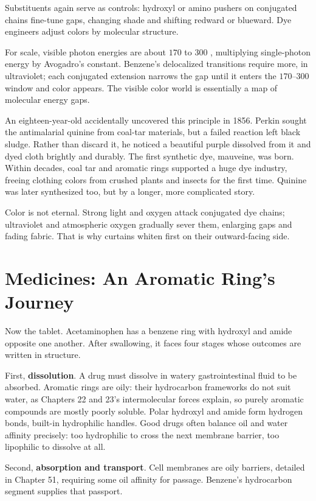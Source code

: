 Substituents again serve as controls: hydroxyl or amino pushers on conjugated chains fine-tune gaps, changing shade and shifting redward or blueward. Dye engineers adjust colors by molecular structure.

For scale, visible photon energies are about $170$ to $300$ , multiplying single-photon energy by Avogadro's constant. Benzene's delocalized transitions require more, in ultraviolet; each conjugated extension narrows the gap until it enters the $170$–$300$ window and color appears. The visible color world is essentially a map of molecular energy gaps.

An eighteen-year-old accidentally uncovered this principle in 1856. Perkin sought the antimalarial quinine from coal-tar materials, but a failed reaction left black sludge. Rather than discard it, he noticed a beautiful purple dissolved from it and dyed cloth brightly and durably. The first synthetic dye, mauveine, was born. Within decades, coal tar and aromatic rings supported a huge dye industry, freeing clothing colors from crushed plants and insects for the first time. Quinine was later synthesized too, but by a longer, more complicated story.

Color is not eternal. Strong light and oxygen attack conjugated dye chains; ultraviolet and atmospheric oxygen gradually sever them, enlarging gaps and fading fabric. That is why curtains whiten first on their outward-facing side.

\section{Medicines: An Aromatic Ring's Journey}

Now the tablet. Acetaminophen has a benzene ring with hydroxyl and amide opposite one another. After swallowing, it faces four stages whose outcomes are written in structure.

First, \textbf{dissolution}. A drug must dissolve in watery gastrointestinal fluid to be absorbed. Aromatic rings are oily: their hydrocarbon frameworks do not suit water, as Chapters 22 and 23's intermolecular forces explain, so purely aromatic compounds are mostly poorly soluble. Polar hydroxyl and amide form hydrogen bonds, built-in hydrophilic handles. Good drugs often balance oil and water affinity precisely: too hydrophilic to cross the next membrane barrier, too lipophilic to dissolve at all.

Second, \textbf{absorption and transport}. Cell membranes are oily barriers, detailed in Chapter 51, requiring some oil affinity for passage. Benzene's hydrocarbon segment supplies that passport.


